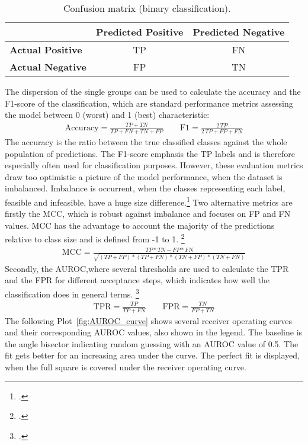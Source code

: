 \begin{table}[ht]
    \centering
    \begin{tabular}{@{}lcc@{}}
        \toprule
                                 & \textbf{Predicted Positive} & \textbf{Predicted Negative} \\
        \midrule
        \textbf{Actual Positive} & \Gls{TP}                    & \Gls{FN}                    \\
        \textbf{Actual Negative} & \Gls{FP}                    & \Gls{TN}                    \\
        \bottomrule
    \end{tabular}
    \caption{Confusion matrix (binary classification).}
    \label{tab:confusion_matrix}
\end{table}

The dispersion of the single groups can be used to calculate the accuracy and the F1-score of the classification,
which are standard performance metrics assessing the model between 0 (worst) and 1 (best) characteristic:
\begin{align}
    \text{Accuracy}=\frac{TP+TN}{TP+FN+TN+FP}
    \qquad
    \text{F1}=\frac{2\,TP}{2\,TP+FP+FN}
\end{align}
The accuracy is the ratio between the true classified classes against the whole population
of predictions. The F1-score emphasis the \gls{TP} labels and is therefore especially
often used for classification purposes.
However, these evaluation metrics draw too optimistic a picture of the model performance,
when the dataset is imbalanced. Imbalance is occurrent,
when the classes representing each label, feasible and infeasible, have a huge size difference.\footcite[cf.][p.2f.]{chicco_advantages_2020}
Two alternative metrics are firstly the \gls{MCC}, which is robust against imbalance
and focuses on \gls{FP} and \gls{FN} values. \gls{MCC} has the advantage to account the majority of the predictions
relative to class size and is defined from -1 to 1. \footcite[cf.][p.5]{chicco_advantages_2020}
\begin{align}
    \text{MCC}=\frac{TP*TN - FP*FN}{\sqrt{(TP+FP)*(TP+FN)*(TN+FP)*(TN+FN)}}
\end{align}
Secondly, the \gls{AUROC},where several thresholds are used
to calculate the \gls{TPR} and the \gls{FPR} for different acceptance steps,
which indicates how well the classification does in general terms. \footcite[cf.][p.2f.]{chicco_advantages_2020}
\begin{align}
    \text{TPR}=\frac{TP}{TP+FN}
    \qquad
    \text{FPR}=\frac{TN}{FP+TN}
\end{align}
The following Plot~\ref{fig:AUROC_curve} shows several receiver operating curves and their corresponding \gls{AUROC} values, also shown
in the legend. The baseline is the angle bisector indicating random guessing with an \gls{AUROC} value of 0.5. The fit gets better
for an increasing area under the curve. The perfect fit is displayed, when the full square is covered under the receiver operating curve.

